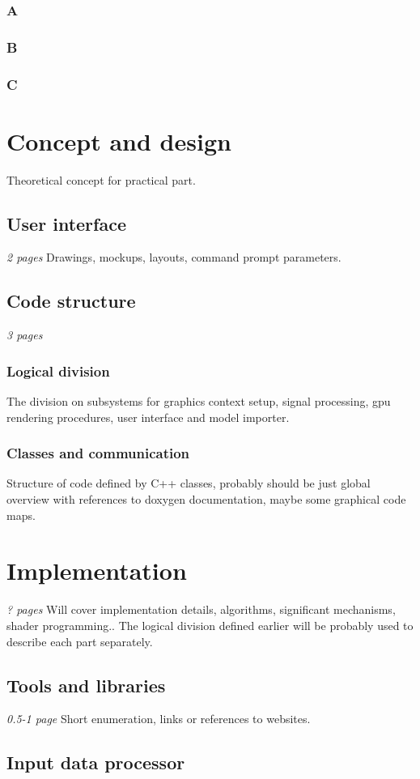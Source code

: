 \subsection{A}
\subsection{B}
\subsection{C}
\chapter{Concept and design}
Theoretical concept for practical part.
\section{User interface}
\emph{2 pages}
Drawings, mockups, layouts, command prompt parameters.
\section{Code structure}
\emph{3 pages}
\subsection{Logical division}
The division on subsystems for graphics context setup, signal processing, gpu
rendering procedures, user interface and model importer.
\subsection{Classes and communication}
Structure of code defined by C++ classes, probably should be just global
overview with references to doxygen documentation, maybe some graphical code
maps.
\chapter{Implementation}
\emph{? pages}
Will cover implementation details, algorithms, significant mechanisms, shader
programming.. The logical division defined earlier will be probably used to
describe each part separately.
\section{Tools and libraries}
\emph{0.5-1 page}
Short enumeration, links or references to websites.
\section{Input data processor}
